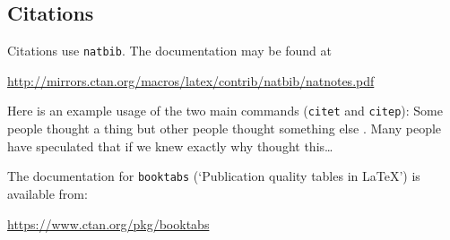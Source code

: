 \documentclass{article}
\begin{document}
\subsection{Citations}
Citations use \verb+natbib+. The documentation may be found at
\begin{center}
	\url{http://mirrors.ctan.org/macros/latex/contrib/natbib/natnotes.pdf}
\end{center}

Here is an example usage of the two main commands (\verb+citet+ and \verb+citep+): Some people thought a
thing \citep{kour2014real, hadash2018estimate} but other people thought something else \citep{kour2014fast}. 
Many people have speculated that if we knew exactly why \citet{kour2014fast} thought this\dots


The documentation for \verb+booktabs+ (`Publication quality tables in LaTeX') is available from:
\begin{center}
	\url{https://www.ctan.org/pkg/booktabs}
\end{center}








\end{document}
